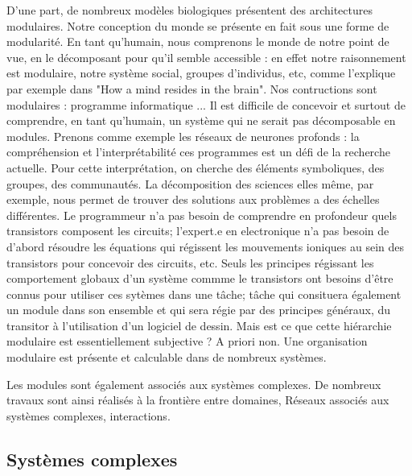 D'une part, de nombreux modèles biologiques présentent des architectures modulaires. Notre conception du monde se présente en fait sous une forme de modularité. En tant qu'humain, nous comprenons le monde de notre point de vue, en le décomposant pour qu'il semble accessible : en effet notre raisonnement est modulaire, notre système social, groupes d'individus, etc, comme l'explique par exemple \cite{Morowitz1995TheMT} dans "How a mind resides in the brain".
Nos contructions sont modulaires : programme informatique ... Il est difficile de concevoir et surtout de comprendre, en tant qu'humain, un système qui ne serait pas décomposable en modules. Prenons comme exemple les réseaux de neurones profonds : la compréhension  et l'interprétabilité ces programmes est un défi de la recherche actuelle. Pour cette interprétation, on cherche des éléments symboliques, des groupes, des communautés. 
La décomposition des sciences elles même, par exemple, nous permet de trouver des solutions aux problèmes a des échelles différentes. Le programmeur n'a pas besoin de comprendre en profondeur quels transistors composent les circuits; l'expert.e en electronique n'a pas besoin de d'abord résoudre les équations qui régissent les mouvements ioniques au sein des transistors pour concevoir des circuits, etc. Seuls les principes régissant les comportement globaux d'un système commme le transistors ont besoins d'être connus pour utiliser ces sytèmes dans une tâche; tâche qui consituera également un module dans son ensemble et qui sera régie par des principes généraux, du transitor à l'utilisation d'un logiciel de dessin. 
Mais est ce que cette hiérarchie modulaire est essentiellement subjective ? A priori non. Une organisation modulaire est présente et calculable dans de nombreux systèmes.


Les modules sont également associés aux systèmes complexes. De nombreux travaux sont ainsi réalisés à la frontière entre domaines, 
Réseaux associés aux systèmes complexes, interactions.


\subsection{Systèmes complexes}

